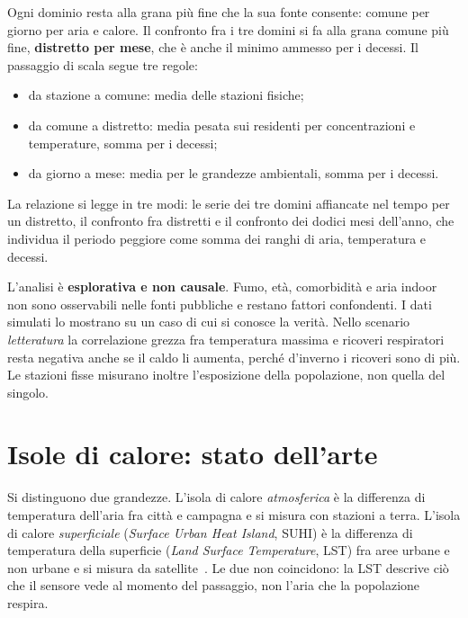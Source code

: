 Ogni dominio resta alla grana più fine che la sua fonte consente: comune per giorno per aria e calore. Il confronto fra i tre domini si fa alla grana comune più fine, \textbf{distretto per mese}, che è anche il minimo ammesso per i decessi. Il passaggio di scala segue tre regole:
\begin{itemize}
  \item da stazione a comune: media delle stazioni fisiche;
  \item da comune a distretto: media pesata sui residenti per concentrazioni e temperature, somma per i decessi;
  \item da giorno a mese: media per le grandezze ambientali, somma per i decessi.
\end{itemize}

La relazione si legge in tre modi: le serie dei tre domini affiancate nel tempo per un distretto, il confronto fra distretti e il confronto dei dodici mesi dell'anno, che individua il periodo peggiore come somma dei ranghi di aria, temperatura e decessi.

L'analisi è \textbf{esplorativa e non causale}. Fumo, età, comorbidità e aria indoor non sono osservabili nelle fonti pubbliche e restano fattori confondenti. I dati simulati lo mostrano su un caso di cui si conosce la verità. Nello scenario \emph{letteratura} la correlazione grezza fra temperatura massima e ricoveri respiratori resta negativa anche se il caldo li aumenta, perché d'inverno i ricoveri sono di più. Le stazioni fisse misurano inoltre l'esposizione della popolazione, non quella del singolo.

\section{Isole di calore: stato dell'arte}
\label{sec:domini-uhi}

Si distinguono due grandezze. L'isola di calore \emph{atmosferica} è la differenza di temperatura dell'aria fra città e campagna e si misura con stazioni a terra. L'isola di calore \emph{superficiale} (\emph{Surface Urban Heat Island}, SUHI) è la differenza di temperatura della superficie (\emph{Land Surface Temperature}, LST) fra aree urbane e non urbane e si misura da satellite~\cite{zhou2019}. Le due non coincidono: la LST descrive ciò che il sensore vede al momento del passaggio, non l'aria che la popolazione respira.

